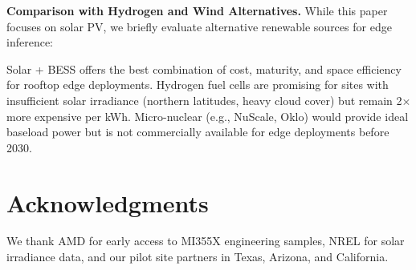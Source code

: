 \documentclass[conference,10pt,letterpaper]{IEEEtran}
\begin{document}
\textbf{Comparison with Hydrogen and Wind Alternatives.} While this paper focuses on solar PV, we briefly evaluate alternative renewable sources for edge inference:

\begin{table}[!t]
\caption{Renewable Energy Source Comparison for Edge AI}
\label{tab:renewables}
\centering\scriptsize
{}
\end{table}

Solar + BESS offers the best combination of cost, maturity, and space efficiency for rooftop edge deployments. Hydrogen fuel cells are promising for sites with insufficient solar irradiance (northern latitudes, heavy cloud cover) but remain 2$\times$ more expensive per kWh. Micro-nuclear (e.g., NuScale, Oklo) would provide ideal baseload power but is not commercially available for edge deployments before 2030.

\section*{Acknowledgments}
We thank AMD for early access to MI355X engineering samples, NREL for solar irradiance data, and our pilot site partners in Texas, Arizona, and California.



\end{document}
